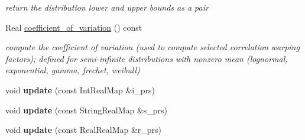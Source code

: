 \begin{DoxyCompactItemize}
\begin{DoxyCompactList}\small\item\em return the distribution lower and upper bounds as a pair \end{DoxyCompactList}\item 
Real \hyperlink{classPecos_1_1HistogramPtRandomVariable_ae1cf1c07047d7ad9dbb899aa01138d54}{coefficient\+\_\+of\+\_\+variation} () const 
\begin{DoxyCompactList}\small\item\em compute the coefficient of variation (used to compute selected correlation warping factors); defined for semi-\/infinite distributions with nonzero mean (lognormal, exponential, gamma, frechet, weibull) \end{DoxyCompactList}\item 
void {\bfseries update} (const Int\+Real\+Map \&i\+\_\+prs)\label{classPecos_1_1HistogramPtRandomVariable_a19e1846bcc2ed19c1822addf9d646e1f}

\item 
void {\bfseries update} (const String\+Real\+Map \&s\+\_\+prs)\label{classPecos_1_1HistogramPtRandomVariable_ab1f05fd4efe04e13629b662fcba2ac29}

\item 
void {\bfseries update} (const Real\+Real\+Map \&r\+\_\+prs)\label{classPecos_1_1HistogramPtRandomVariable_ac1d07439880169985bcc7d779632f638}

\end{DoxyCompactItemize}
